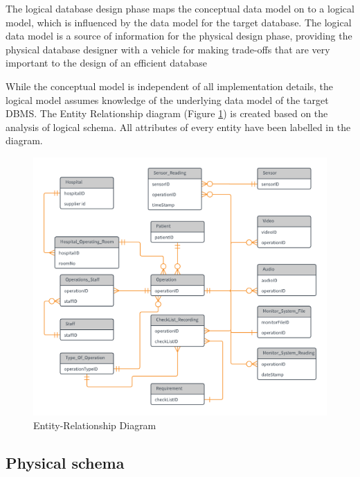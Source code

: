 The logical database design phase maps the conceptual data model on to a logical model, which is influenced by the data model for the target database. The logical data model is a source of information for the physical design phase, providing the physical database designer with a vehicle for making trade-offs that are very important to the design of an efficient database \cite{Database_Systems}

While the conceptual model is independent of all implementation details, the logical model assumes knowledge of the underlying data model
of the target DBMS. The Entity Relationship diagram (Figure \ref{er_diagram}) is created based on the analysis of logical schema. All attributes of every entity have been labelled in the diagram.


\begin{figure}[h]
\begin{center}
\includegraphics[width=17cm]{imgs/er_diagram.png}
\end{center}\vspace{-0.3cm}
\caption[Entity-Relationship Diagram]{Entity-Relationship Diagram} \label{er_diagram}
\end{figure}


\subsection{Physical schema}

